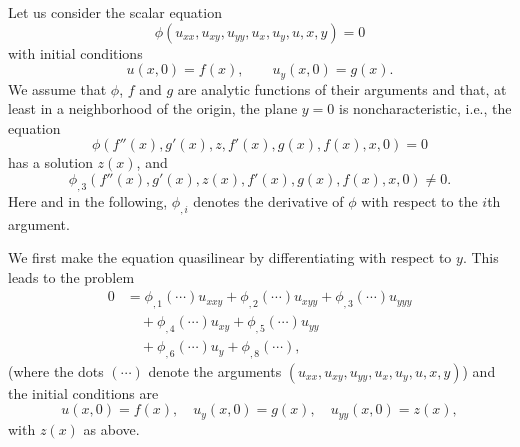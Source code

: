 \begin{Example}\label{ex:scalar-general-reduction}Let us consider the scalar equation
\begin{equation}\label{eq:scalar-nonlinear-reduction-origin}
\phi(u_{xx},u_{xy},u_{yy},u_x,u_y,u,x,y)=0
\end{equation}
with initial conditions
\begin{equation}\label{eq:scalar-nonlinear-reduction-initial}
u(x,0)=f(x),\qquad u_y(x,0)=g(x).
\end{equation}
We assume that $\phi$, $f$ and $g$ are analytic functions of their arguments and that, at least in a neighborhood of the origin, the plane $y=0$ is noncharacteristic, i.e., the equation
\begin{equation}\label{eq:scalar-nonlinear-initial-constraint}
\phi(f''(x),g'(x),z,f'(x),g(x),f(x),x,0)=0
\end{equation}
has a solution $z(x)$, and
\begin{equation}\label{eq:scalar-nonlinear-noncharacteristic}
\phi_{,3}(f''(x),g'(x),z(x),f'(x),g(x),f(x),x,0)\ne0.
\end{equation}
Here and in the following, $\phi_{,i}$ denotes the derivative of $\phi$ with respect to the $i$th argument.

We first make the equation quasilinear by differentiating with respect to $y$. This leads to the problem
\begin{equation}\label{eq:differentiated-scalar-nonlinear-equation}
\begin{aligned}
0&=\phi_{,1}(\cdots)u_{xxy}+\phi_{,2}(\cdots)u_{xyy}+\phi_{,3}(\cdots)u_{yyy}\\
&\quad+\phi_{,4}(\cdots)u_{xy}+\phi_{,5}(\cdots)u_{yy}\\
&\quad+\phi_{,6}(\cdots)u_y+\phi_{,8}(\cdots),
\end{aligned}
\end{equation}
(where the dots $(\cdots)$ denote the arguments $(u_{xx},u_{xy},u_{yy},u_x,u_y,u,x,y)$) and the initial conditions are
\begin{equation}\label{eq:differentiated-scalar-initial-data}
u(x,0)=f(x),\quad u_y(x,0)=g(x),\quad u_{yy}(x,0)=z(x),
\end{equation}
with $z(x)$ as above.


\end{Example}
